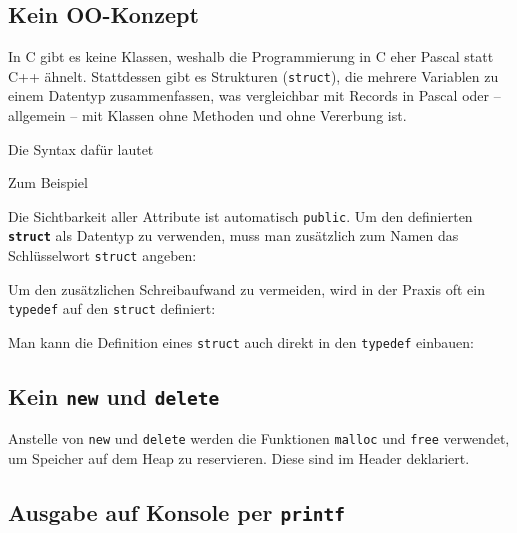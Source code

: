 \subsection{Kein OO-Konzept}
In C gibt es keine Klassen, weshalb die Programmierung in C eher Pascal statt C++ ähnelt.
Stattdessen gibt es Strukturen (\lstinline{struct}), die mehrere Variablen zu einem Datentyp zusammenfassen, was vergleichbar mit Records in Pascal oder -- allgemein -- mit Klassen ohne Methoden und ohne Vererbung ist.

Die Syntax dafür lautet


Zum Beispiel


Die Sichtbarkeit aller Attribute ist automatisch \lstinline{public}.
Um den definierten \textbf{\lstinline|struct|} als Datentyp zu verwenden, muss man zusätzlich zum Namen das Schlüsselwort \lstinline{struct} angeben:


Um den zusätzlichen Schreibaufwand zu vermeiden, wird in der Praxis oft ein \lstinline{typedef} auf den \lstinline{struct} definiert:


Man kann die Definition eines \lstinline{struct} auch direkt in den \lstinline{typedef} einbauen:


\subsection{Kein \lstinline{new} und \lstinline{delete}}

Anstelle von \lstinline{new} und \lstinline{delete} werden die Funktionen \lstinline{malloc} und \lstinline{free} verwendet, um Speicher auf dem Heap zu reservieren.
Diese sind im Header  deklariert.


\subsection{Ausgabe auf Konsole per \lstinline{printf}}

